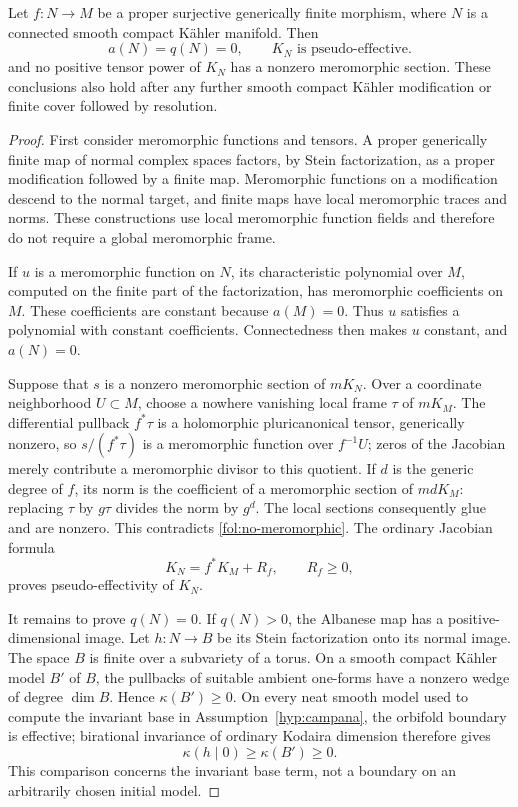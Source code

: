 \begin{lemma}\label{fol:virtual-vanishing}
Let $f\colon N\to M$ be a proper surjective generically finite morphism,
where $N$ is a connected smooth compact K\"ahler manifold.  Then
\begin{equation}\label{fol:virtual-data}
 a(N)=q(N)=0,\qquad K_N\text{ is pseudo-effective}.
\end{equation}
and no positive tensor power of $K_N$ has a nonzero meromorphic section.
These conclusions also hold after any further smooth compact K\"ahler
modification or finite cover followed by resolution.
\end{lemma}

\begin{proof}
First consider meromorphic functions and tensors.  A proper generically
finite map of normal complex spaces factors, by Stein factorization, as a
proper modification followed by a finite map.  Meromorphic functions on a
modification descend to the normal target, and finite maps have local
meromorphic traces and norms.  These constructions use local meromorphic
function fields and therefore do not require a global meromorphic frame.

If $u$ is a meromorphic function on $N$, its characteristic polynomial over
$M$, computed on the finite part of the factorization, has meromorphic
coefficients on $M$.  These coefficients are constant because $a(M)=0$.
Thus $u$ satisfies a polynomial with constant coefficients.  Connectedness
then makes $u$ constant, and $a(N)=0$.

Suppose that $s$ is a nonzero meromorphic section of $mK_N$.  Over a
coordinate neighborhood $U\subset M$, choose a nowhere vanishing local
frame $\tau$ of $mK_M$.  The differential pullback $f^*\tau$ is a
holomorphic pluricanonical tensor, generically nonzero, so
$s/(f^*\tau)$ is a meromorphic function over $f^{-1}U$; zeros of the
Jacobian merely contribute a meromorphic divisor to this quotient.
If $d$ is the generic degree of $f$, its norm is the coefficient of a
meromorphic section of $mdK_M$: replacing $\tau$ by $g\tau$ divides the
norm by $g^d$.  The local sections consequently glue and are nonzero.
This contradicts \eqref{fol:no-meromorphic}.  The ordinary Jacobian
formula
\[
 K_N=f^*K_M+R_f,\qquad R_f\geq0,
\]
proves pseudo-effectivity of $K_N$.

It remains to prove $q(N)=0$.  If $q(N)>0$, the Albanese map has a
positive-dimensional image.  Let $h\colon N\to B$ be its Stein
factorization onto its normal image.  The space $B$ is finite over a
subvariety of a torus.  On a smooth compact K\"ahler model $B'$ of $B$,
the pullbacks of suitable ambient one-forms have a nonzero wedge of
degree $\dim B$.  Hence $\kappa(B')\geq0$.  On every neat smooth model
used to compute the invariant base in Assumption~\ref{hyp:campana}, the
orbifold boundary is effective; birational invariance of ordinary
Kodaira dimension therefore gives
\[
 \kappa(h\mid0)\geq\kappa(B')\geq0.
\]
This comparison concerns the invariant base term, not a boundary on an
arbitrarily chosen initial model.


\end{proof}
